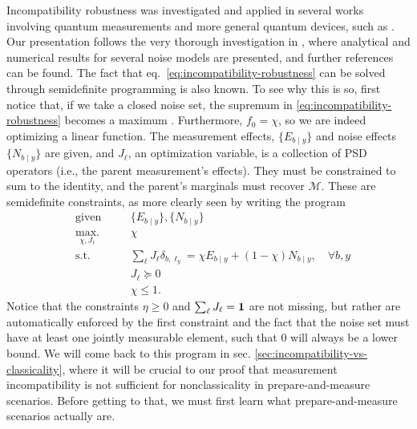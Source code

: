 				Incompatibility robustness was investigated and applied in several works involving quantum measurements and more general quantum devices, such as \cite{heinosaari_noiserobustness_2015,designolle_robustness_2019,uola_onetoonesteering_2015}. Our presentation follows the very thorough investigation in \cite{designolle_robustness_2019}, where analytical and numerical results for several noise models are presented, and further references can be found. The fact that eq.~\eqref{eq:incompatibility-robustness} can be solved through semidefinite programming is also known. To see why this is so, first notice that, if we take a closed noise set, the supremum in \eqref{eq:incompatibility-robustness} becomes a maximum . Furthermore, $f_0 = \chi$, so we are indeed optimizing a linear function. The measurement effects, $\{ E_{b \mid y} \}$ and noise effects $\{ N_{b \mid y} \}$ are given, and $J_\ell$, an optimization variable, is a collection of PSD operators (i.e., the parent measurement's effects). They must be constrained to sum to the identity, and the parent's marginals must recover $\mathcal{M}$. These are semidefinite constraints, as more clearly seen by writing the program
				\begin{subequations}
					\begin{alignat}{2}
						&\text{given}    &\quad &\{ E_{b \mid y} \}, \{ N_{b \mid y} \} \\
						&\underset{\chi, J_\ell}{\text{max.}}   &	  & \chi \\
						&\text{s.t.}    &      &  \sum_\ell J_\ell \delta_{b, \ell_y} = \chi E_{b \mid y}  + (1 - \chi) N_{b \mid y}, \quad\forall b, y \\
						&				&		& J_\ell \succeq 0 \\
						&				&		& \chi \leq 1 .
					\end{alignat}
					\label{eq:incompatibility-robustness-sdp}
				\end{subequations}
				Notice that the constraints $\eta \geq 0$ and $\sum_\ell J_\ell = \mathbf{1}$ are not missing, but rather are automatically enforced by the first constraint and the fact that the noise set must have at least one jointly measurable element, such that $0$ will always be a lower bound. We will come back to this program in sec. \ref{sec:incompatibility-vs-classicality}, where it will be crucial to our proof that measurement incompatibility is not sufficient for nonclassicality in prepare-and-measure scenarios. Before getting to that, we must first learn what prepare-and-measure scenarios actually are.
